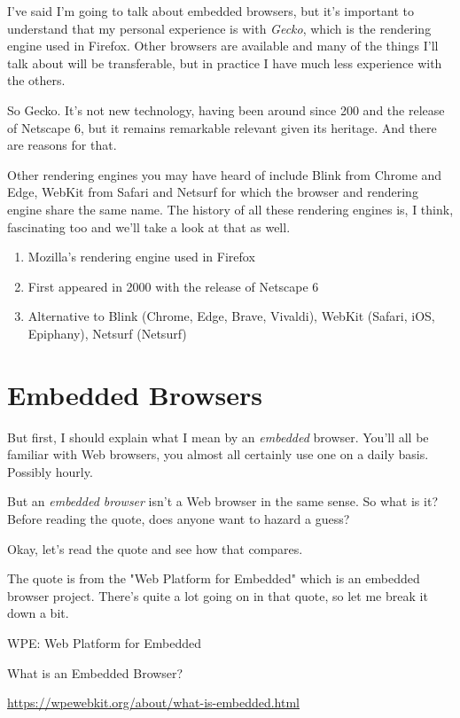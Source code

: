 \documentclass{article}
\begin{document}
I've said I'm going to talk about embedded browsers, but it's important to understand that my personal experience is with {\it Gecko\/}, which is the rendering engine used in Firefox. Other browsers are available and many of the things I'll talk about will be transferable, but in practice I have much less experience with the others.

So Gecko. It's not new technology, having been around since 200 and the release of Netscape 6, but it remains remarkable relevant given its heritage. And there are reasons for that.

Other rendering engines you may have heard of include Blink from Chrome and Edge, WebKit from Safari and Netsurf for which the browser and rendering engine share the same name. The history of all these rendering engines is, I think, fascinating too and we'll take a look at that as well.

\begin{enumerate}
\item Mozilla's rendering engine used in Firefox
\item First appeared in 2000 with the release of Netscape 6
\item Alternative to Blink (Chrome, Edge, Brave, Vivaldi), WebKit (Safari, iOS, Epiphany), Netsurf (Netsurf)
\end{enumerate}


\section{Embedded Browsers}

But first, I should explain what I mean by an {\it embedded\/} browser. You'll all be familiar with Web browsers, you almost all certainly use one on a daily basis. Possibly hourly.

But an {\it embedded browser\/} isn't a Web browser in the same sense. So what is it? Before reading the quote, does anyone want to hazard a guess?

Okay, let's read the quote and see how that compares.

The quote is from the "Web Platform for Embedded" which is an embedded browser project. There's quite a lot going on in that quote, so let me break it down a bit.

WPE: Web Platform for Embedded

What is an Embedded Browser?

\url{https://wpewebkit.org/about/what-is-embedded.html}
\end{document}
